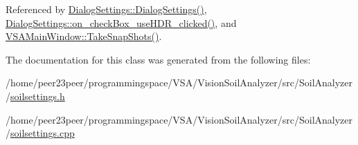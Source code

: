 Referenced by \hyperlink{dialogsettings_8cpp_source_l00005}{Dialog\+Settings\+::\+Dialog\+Settings()}, \hyperlink{dialogsettings_8cpp_source_l00256}{Dialog\+Settings\+::on\+\_\+check\+Box\+\_\+use\+H\+D\+R\+\_\+clicked()}, and \hyperlink{vsamainwindow_8cpp_source_l00391}{V\+S\+A\+Main\+Window\+::\+Take\+Snap\+Shots()}.



The documentation for this class was generated from the following files\+:\begin{DoxyCompactItemize}
\item 
/home/peer23peer/programmingspace/\+V\+S\+A/\+Vision\+Soil\+Analyzer/src/\+Soil\+Analyzer/\hyperlink{soilsettings_8h}{soilsettings.\+h}\item 
/home/peer23peer/programmingspace/\+V\+S\+A/\+Vision\+Soil\+Analyzer/src/\+Soil\+Analyzer/\hyperlink{soilsettings_8cpp}{soilsettings.\+cpp}\end{DoxyCompactItemize}
